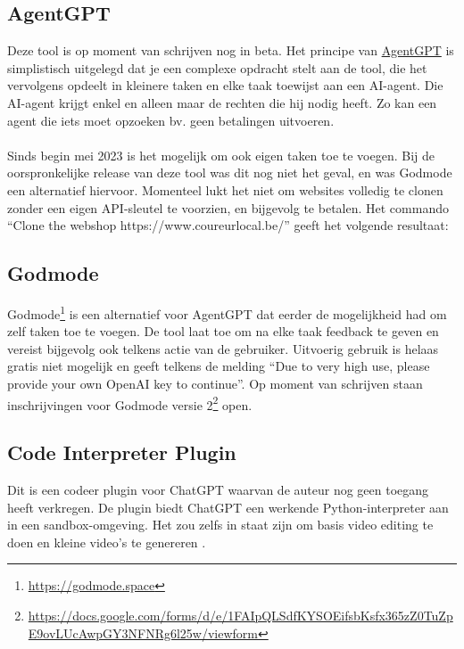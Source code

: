 \subsection{AgentGPT} 
Deze tool is op moment van schrijven nog in beta. Het principe van \href{https://agentgpt.reworkd.ai/nl}{AgentGPT} is simplistisch uitgelegd dat je een complexe opdracht stelt aan de tool, die het vervolgens opdeelt in kleinere taken en elke taak toewijst aan een AI-agent. Die AI-agent krijgt enkel en alleen maar de rechten die hij nodig heeft. Zo kan een agent die iets moet opzoeken bv. geen betalingen uitvoeren. 
\\\\
Sinds begin mei 2023 is het mogelijk om ook eigen taken toe te voegen. Bij de oorspronkelijke release van deze tool was dit nog niet het geval, en was Godmode een alternatief hiervoor. Momenteel lukt het niet om websites volledig te clonen zonder een eigen API-sleutel te voorzien, en bijgevolg te betalen. Het commando “Clone the webshop https://www.coureurlocal.be/” geeft het volgende resultaat:

\subsection{Godmode}
Godmode\footnote{\href{https://godmode.space}{https://godmode.space}} is een alternatief voor AgentGPT dat eerder de mogelijkheid had om zelf taken toe te voegen. De tool laat toe om na elke taak feedback te geven en vereist bijgevolg ook telkens actie van de gebruiker. Uitvoerig gebruik is helaas gratis niet mogelijk en geeft telkens de melding “Due to very high use, please provide your own OpenAI key to continue”. Op moment van schrijven staan inschrijvingen voor Godmode versie 2\footnote{ \href{https://docs.google.com/forms/d/e/1FAIpQLSdfKYSOEifsbKsfx365zZ0TuZpE9ovLUcAwpGY3NFNRg6l25w/viewform}{https://docs.google.com/forms/d/e/1FAIpQLSdfKYSOEifsbKsfx365zZ0TuZpE9ovLUcAwpGY3NFNRg6l25w/viewform}} open.
\subsection{Code Interpreter Plugin}
Dit is een codeer plugin voor ChatGPT waarvan de auteur nog geen toegang heeft verkregen. De plugin biedt ChatGPT een werkende Python-interpreter aan in een sandbox-omgeving. Het zou zelfs in staat zijn om basis video editing te doen en kleine video's te genereren \autocite{Jose2023}.
